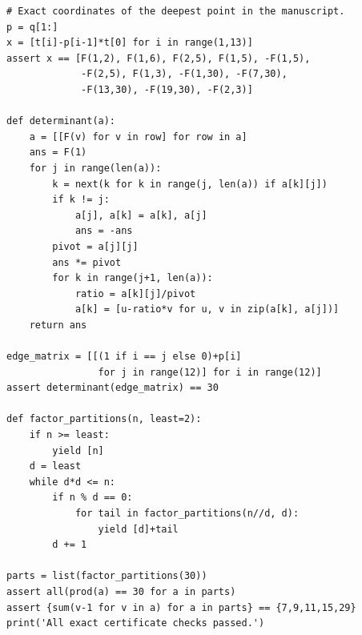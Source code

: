 \documentclass[11pt,a4paper]{article}
\theoremstyle{definition}\newtheorem{definition}[theorem]{Definition}
\theoremstyle{remark}\newtheorem{remark}[theorem]{Remark}
\begin{document}
\begin{Verbatim}[fontsize=\footnotesize,frame=single,framesep=3mm]
# Exact coordinates of the deepest point in the manuscript.
p = q[1:]
x = [t[i]-p[i-1]*t[0] for i in range(1,13)]
assert x == [F(1,2), F(1,6), F(2,5), F(1,5), -F(1,5),
             -F(2,5), F(1,3), -F(1,30), -F(7,30),
             -F(13,30), -F(19,30), -F(2,3)]

def determinant(a):
    a = [[F(v) for v in row] for row in a]
    ans = F(1)
    for j in range(len(a)):
        k = next(k for k in range(j, len(a)) if a[k][j])
        if k != j:
            a[j], a[k] = a[k], a[j]
            ans = -ans
        pivot = a[j][j]
        ans *= pivot
        for k in range(j+1, len(a)):
            ratio = a[k][j]/pivot
            a[k] = [u-ratio*v for u, v in zip(a[k], a[j])]
    return ans

edge_matrix = [[(1 if i == j else 0)+p[i]
                for j in range(12)] for i in range(12)]
assert determinant(edge_matrix) == 30

def factor_partitions(n, least=2):
    if n >= least:
        yield [n]
    d = least
    while d*d <= n:
        if n % d == 0:
            for tail in factor_partitions(n//d, d):
                yield [d]+tail
        d += 1

parts = list(factor_partitions(30))
assert all(prod(a) == 30 for a in parts)
assert {sum(v-1 for v in a) for a in parts} == {7,9,11,15,29}
print('All exact certificate checks passed.')
\end{Verbatim}
\end{document}
